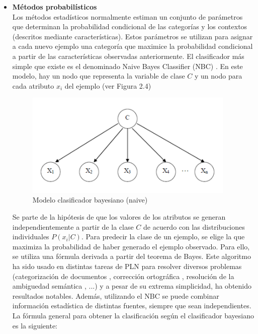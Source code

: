 \begin{itemize}
  \item \textbf{Métodos probabilísticos} \\
  Los métodos estadísticos normalmente estiman un conjunto de parámetros que determinan la probabilidad condicional de las categorías y los contextos (descritos mediante características). Estos parámetros se utilizan para asignar a cada nuevo ejemplo una categoría que maximice la probabilidad condicional a partir de las características observadas anteriormente. El clasificador más simple que existe es el denominado Naive Bayes Classifier (NBC) \cite{020}. En este modelo, hay un nodo que representa la variable de clase $C$ y un nodo para cada atributo $x_i$ del ejemplo (ver Figura 2.4)

  \begin{figure}[h!]
    \begin{center}
    \includegraphics[angle=0, width=10cm]{Graficos/bayesiano}
    \caption{Modelo clasificador bayesiano (naive)}
    \label{fig:bayesiano}
    \end{center}
  \end{figure} 
  Se parte de la hipótesis de que los valores de los atributos se generan independientemente a partir de la clase $C$ de acuerdo con las distribuciones individuales $P(x_i|C)$. Para predecir la clase de un ejemplo, se elige la que maximiza la probabilidad de haber generado el ejemplo observado. Para ello, se utiliza una fórmula derivada a partir del teorema de Bayes. Este algoritmo ha sido usado en distintas tareas de PLN para resolver diversos problemas (categorización de documentos \cite{021}, corrección ortográfica \cite{022}, resolución de la ambiguedad semántica \cite{023}, \cite{024} ...) y a pesar de su extrema simplicidad, ha obtenido resultados notables. Además, utilizando el NBC se puede combinar información estadística de distintas fuentes, siempre que sean independientes. La fórmula general para obtener la clasificación según el clasificador bayesiano es la siguiente:


\end{itemize}
